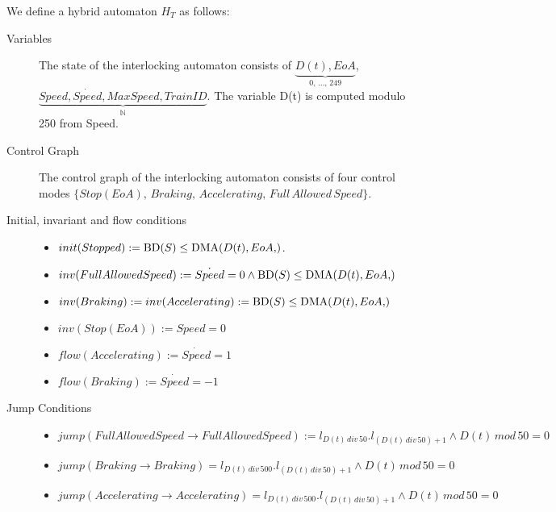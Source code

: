 \begin{mydef}

We define a hybrid automaton $H_{T}$ as follows:
\begin{description}
\item[Variables] The state of the interlocking automaton consists of $\underbrace{D(t), EoA}_\text{0, \ldots , 249}$, \newline $\underbrace{Speed, \dot{Speed}, MaxSpeed, TrainID}_{\mathbb{N}}$. The variable D(t) is computed modulo 250 from Speed.

\item[Control Graph] The control graph of the interlocking automaton consists of four control modes $\{Stop (EoA), \, Braking, \, Accelerating, \, Full \, Allowed \, Speed \}$.

\item[Initial, invariant and flow conditions] \hspace*{0mm}
	\begin{itemize}
	\item $init(Stopped) :=   \BD{S} \leq \DMA{D(t),EoA}  $.

	\item $inv(Full Allowed Speed) :=   \dot{Speed} = 0 \wedge \BD{S} \leq \DMA{D(t),EoA}$ 

	\item $inv(Braking)  := inv(Accelerating) := \BD{S} \leq \DMA{D(t),EoA}$

	
	\item $inv(Stop (EoA)) := Speed = 0$ 
             
	\item $flow(Accelerating):= \dot{Speed} = 1$ 
	
	\item $flow(Braking) := \dot{Speed} = -1$
 
	\end{itemize}

\item[Jump Conditions] \hspace*{0mm}

	\begin{itemize}
	\item $jump(Full Allowed Speed \to Full Allowed Speed) := l_{D(t) \, div \, 50}.l_{(D(t) \, div \, 50) +1} \wedge D(t) \, mod \, 50 = 0$
\item $jump(Braking \to Braking) = l_{D(t) \, div \, 500}.l_{(D(t) \, div \, 50) +1} \wedge D(t) \, mod \, 50 = 0$
\item $jump(Accelerating \to Accelerating) = l_{D(t) \, div \, 500}.l_{(D(t) \, div \, 50) +1} \wedge D(t) \, mod \, 50 = 0$


\end{itemize}
\end{description}
\end{mydef}
